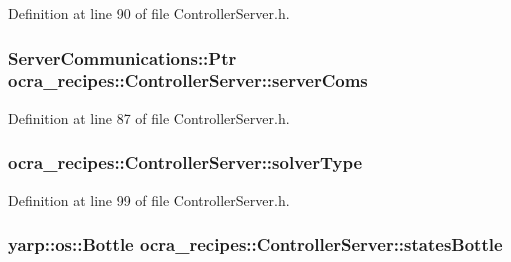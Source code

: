 Definition at line 90 of file Controller\+Server.\+h.

\subsubsection[{\texorpdfstring{server\+Coms}{serverComs}}]{\setlength{\rightskip}{0pt plus 5cm}Server\+Communications\+::\+Ptr ocra\+\_\+recipes\+::\+Controller\+Server\+::server\+Coms\hspace{0.3cm}{\ttfamily [protected]}}\hypertarget{classocra__recipes_1_1ControllerServer_af01dc7be410bfebebefedc5f4bb27d1b}{}\label{classocra__recipes_1_1ControllerServer_af01dc7be410bfebebefedc5f4bb27d1b}


Definition at line 87 of file Controller\+Server.\+h.

\subsubsection[{\texorpdfstring{solver\+Type}{solverType}}]{ ocra\+\_\+recipes\+::\+Controller\+Server\+::solver\+Type\hspace{0.3cm}{\ttfamily [protected]}}\hypertarget{classocra__recipes_1_1ControllerServer_a7c7d1eda2c96085709f0c3a28fd998a4}{}\label{classocra__recipes_1_1ControllerServer_a7c7d1eda2c96085709f0c3a28fd998a4}


Definition at line 99 of file Controller\+Server.\+h.

\subsubsection[{\texorpdfstring{states\+Bottle}{statesBottle}}]{\setlength{\rightskip}{0pt plus 5cm}yarp\+::os\+::\+Bottle ocra\+\_\+recipes\+::\+Controller\+Server\+::states\+Bottle\hspace{0.3cm}{\ttfamily [protected]}}\hypertarget{classocra__recipes_1_1ControllerServer_a587f8ef2bc028bf845b1713955def5a1}{}\label{classocra__recipes_1_1ControllerServer_a587f8ef2bc028bf845b1713955def5a1}


